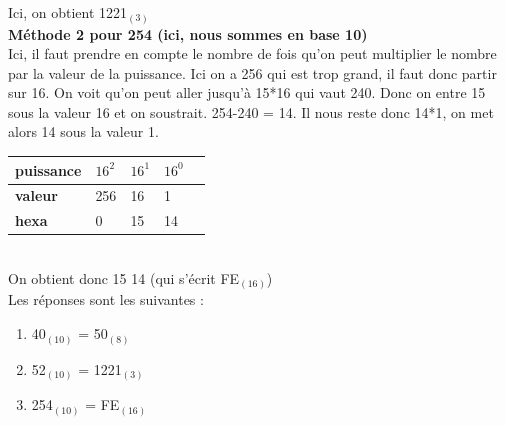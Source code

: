 \begin{Exercice}[15 minutes]
\begin{solution}
        Ici, on obtient 1221$_{(3)}$ \\
        
        \textbf{Méthode 2 pour 254 (ici, nous sommes en base 10)} \\
        
        Ici, il faut prendre en compte le nombre de fois qu'on peut multiplier le nombre par la valeur de la puissance. Ici on a 256 qui est trop grand, il faut donc partir sur 16. On voit qu'on peut aller jusqu'à 15*16 qui vaut 240. Donc on entre 15 sous la valeur 16 et on soustrait. 254-240 = 14. Il nous reste donc 14*1, on met alors 14 sous la valeur 1. \\
        
   		\begin{tabular}{| C{0.1\textwidth} | C{0.1\textwidth} | C{0.1\textwidth} | C{0.1\textwidth} | C{0.1\textwidth} |} 
            \hline
            \textbf{puissance} & $16^{2}$ & $16^{1}$ & $16^{0}$ \\ [0.5ex] 
            \hline
            \textbf{valeur} & 256 & 16 & 1 \\ [0.5ex] 
            \hline
            \textbf{hexa} & 0 & 15 & 14 \\ [0.5ex] 
            \hline
        \end{tabular} \\
        
        On obtient donc 15 14 (qui s'écrit FE$_{(16)}$)\\
        
        Les réponses sont les suivantes :
        \begin{enumerate}
        \item 40$_{(10)}$ = 50$_{(8)}$
        \item 52$_{(10)}$ = 1221$_{(3)}$
        \item 254$_{(10)}$ = FE$_{(16)}$
        \end{enumerate}
    \end{solution}
\end{Exercice}

